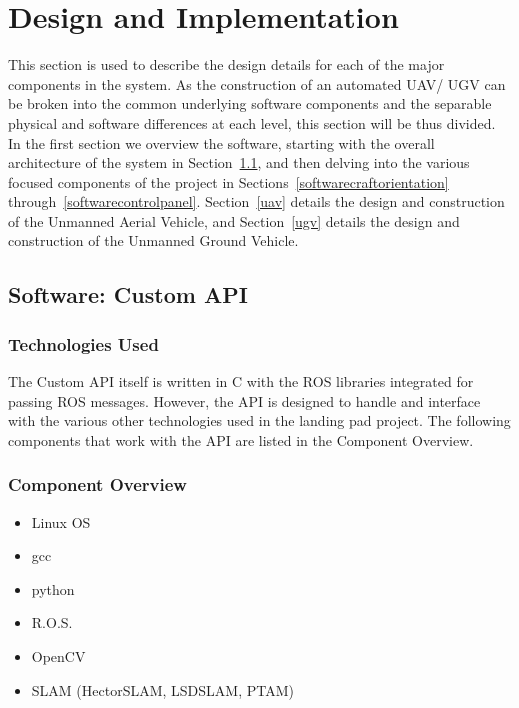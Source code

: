\chapter{Design  and Implementation}\label{chapterDesignAndImplementation}

This section is used to describe the design details for each of the major components 
in the system.  As the construction of an automated UAV/ UGV can be broken into the
common underlying software components and the separable physical and software
differences at each level, this section will be thus divided.  In the first section we overview
the software, starting with the overall architecture of the system in Section~\ref{softwarecustomapi}, and then delving into the various focused components of the project in Sections~\ref{softwarecraftorientation} through~\ref{softwarecontrolpanel}.  Section~\ref{uav} details the design and construction of the Unmanned Aerial Vehicle, and Section~\ref{ugv} details the design and construction of the Unmanned Ground Vehicle.
 

\section{Software: Custom API}\label{softwarecustomapi}

\subsection{Technologies  Used}
The Custom API itself is written in C with the ROS libraries integrated for passing ROS messages. However, the API is designed to handle and interface with the various other technologies used in the landing pad project. The following components that work with the API are listed in the Component Overview.

\subsection{Component  Overview}
\begin{itemize}
  \item Linux OS
  \item gcc
  \item python
  \item R.O.S.
  \item OpenCV
  \item SLAM (HectorSLAM, LSDSLAM, PTAM)
\end{itemize}


